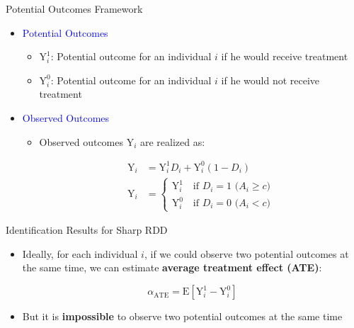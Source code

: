 \documentclass[hyperref={pdfpagelabels=false}]{beamer}
\begin{document}
\begin{frame}{Potential Outcomes Framework}{}
		\begin{itemize} 
\item \textcolor{blue}{Potential Outcomes} 
		\vspace{0.2cm}
				\begin{itemize} 
		\item $\mathrm{Y}^{1}_{i}$: Potential outcome for an individual $i$ if he would receive treatment
		\vspace{0.2cm}
		\item $\mathrm{Y}^{0}_{i}$: Potential outcome for an individual  $i$ if he would not receive treatment
	\end{itemize}
	\vspace{0.2cm}
	
\item \textcolor{blue}{Observed Outcomes} 
		\vspace{0.2cm}
	\begin{itemize} 
		
		\item Observed outcomes $\mathrm{Y}_i$ are realized as: 
		
		\begin{align*}
		\mathrm{Y}_i&=\mathrm{Y}^{1}_{i}D_i+\mathrm{Y}^{0}_{i}(1-D_i)\\
		\mathrm{Y}_i &= \left\lbrace
		\begin{array}{l}
		\mathrm{Y}^{1}_{i}\quad \text{if $D_i=1$ ($A_i\geq c$)} \\
		\mathrm{Y}^{0}_{i}\quad \text{if $D_i=0$ ($A_i<c$)}
		\end{array} \right.
		\end{align*}
		
		
	\end{itemize}
	\end{itemize}
\end{frame}


\begin{frame}{Identification Results for Sharp RDD}{}
	\begin{itemize}
		
		\item Ideally, for each individual $i$, if we could observe two potential outcomes at the same time, we can estimate \textbf{average treatment effect (ATE)}:
		
		\begin{equation*}
		\alpha_{\text{ATE}}=\mathrm{E}[\mathrm{Y}^{1}_{i}-\mathrm{Y}^{0}_{i}]
		\end{equation*}	
		
		\item But it is \textbf{impossible} to observe two potential outcomes at the same time		
		
	\end{itemize}
\end{frame}
\end{document}
